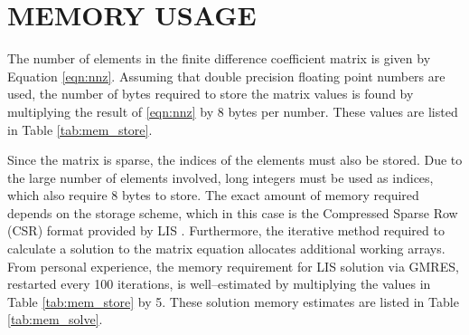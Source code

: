 \chapter{MEMORY USAGE}
\label{chap:memory_usage}

The number of elements in the finite difference coefficient matrix is given by Equation \eqref{eqn:nnz}.
Assuming that double precision floating point numbers are used, the number of bytes required to store the matrix values is found by multiplying the result of \eqref{eqn:nnz} by 8 bytes per number.
These values are listed in Table \ref{tab:mem_store}.

Since the matrix is sparse, the indices of the elements must also be stored.
Due to the large number of elements involved, long integers must be used as indices, which also require 8 bytes to store.
The exact amount of memory required depends on the storage scheme, which in this case is the Compressed Sparse Row (CSR) format provided by LIS \cite{nishida_experience_2010}.
Furthermore, the iterative method required to calculate a solution to the matrix equation allocates additional working arrays.
From personal experience, the memory requirement for LIS solution via GMRES, restarted every 100 iterations, is well--estimated by multiplying the values in Table \ref{tab:mem_store} by 5.
These solution memory estimates are listed in Table \ref{tab:mem_solve}.

